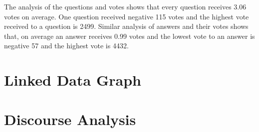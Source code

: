 The analysis of the questions and votes shows that every question receives 3.06 votes on average. One question received negative 115 votes and the highest vote received to a question is 2499. Similar analysis of answers and their votes shows that, on average an answer receives 0.99 votes and the lowest vote to an answer is negative 57 and the highest vote is 4432.


\section{Linked Data Graph}




\section{Discourse Analysis}